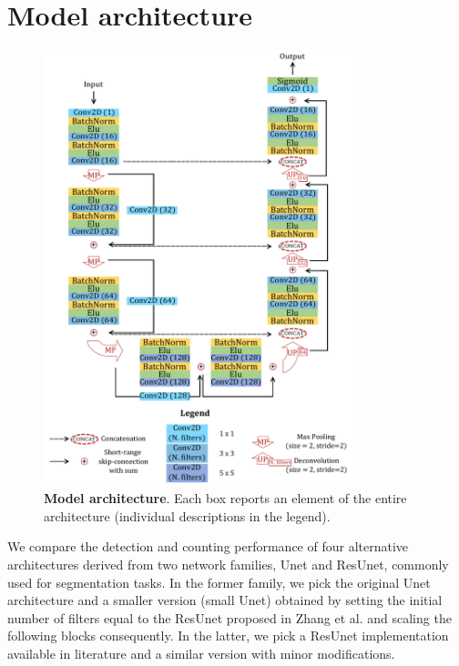 \section{Model architecture}
\label{model_architecture}

\begin{figure}
\centerline{
\includegraphics[width=0.8\textwidth]{figures/130_methods/c-resunet_architecture.pdf}
}
\caption{\textbf{Model architecture}. Each box reports an element of the entire architecture (individual descriptions in the legend). 
} \label{fig:model_architecture}
\end{figure}
We compare the detection and counting performance of four alternative architectures derived from two network families, Unet and ResUnet, commonly used for segmentation tasks.
In the former family, we pick the original Unet architecture \cite{unet} and a smaller version (small Unet) obtained by setting the initial number of filters equal to the ResUnet proposed in Zhang et al. \cite{deep_resunet} and scaling the following blocks consequently.
In the latter, we pick a ResUnet implementation available in literature \cite{deep_resunet} and a similar version with minor modifications.
